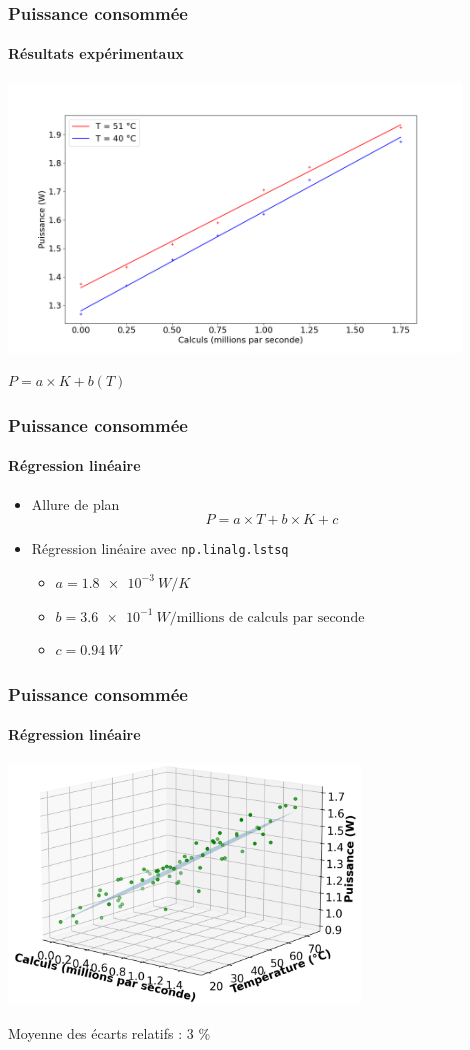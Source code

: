 \documentclass[a4paper,11pt]{beamer}
\newcommand{\p}{\texttt} %
\begin{document}
\begin{frame}
    \frametitle{Puissance consommée}
    \framesubtitle{Résultats expérimentaux}

    \includegraphics[width=0.9\textwidth]{difference_en_temperature.png}
    \begin{center}
        $P = a\times K + b(T)$
    \end{center}
\end{frame}

\begin{frame}
    \frametitle{Puissance consommée}
    \framesubtitle{Régression linéaire}

    \begin{itemize}
        \item Allure de plan
        $$P = a \times T + b \times K + c$$
        \item Régression linéaire avec \p{np.linalg.lstsq}
        \begin{itemize}
            \item $a = \SI{1.8e-3}{W/K}$
            \item $b = \SI{3.6e-1}{W/\text{millions de calculs par seconde}}$
            \item $c = \SI{0.94}{W}$
        \end{itemize}
    \end{itemize}
\end{frame}

\begin{frame}
    \frametitle{Puissance consommée}
    \framesubtitle{Régression linéaire}

    \begin{center}
        \includegraphics[width=0.7\textwidth]{regression_cube.png}

        Moyenne des écarts relatifs : 3 \%
    \end{center}
\end{frame}
\end{document}
